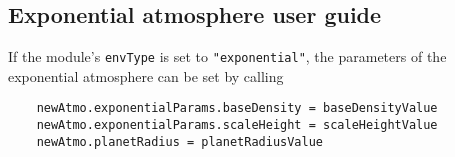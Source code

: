 \subsection{Exponential atmosphere user guide}
If the module's \verb|envType| is set to \verb|"exponential"|, the parameters of the exponential atmosphere can be set by calling
\begin{verbatim}
    newAtmo.exponentialParams.baseDensity = baseDensityValue
    newAtmo.exponentialParams.scaleHeight = scaleHeightValue
    newAtmo.planetRadius = planetRadiusValue
\end{verbatim}